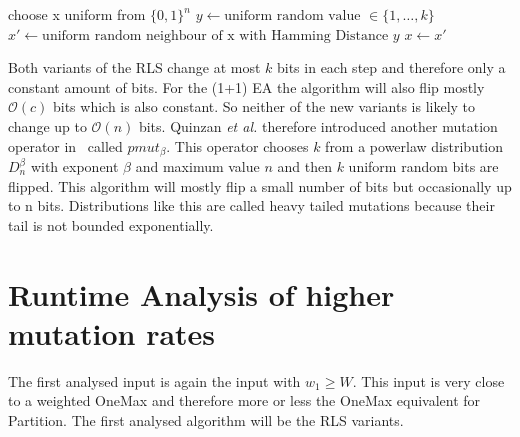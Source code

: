 \begin{algorithm}[bt]
      \caption{\textsc{\RLSR}}\label{alg:rlsR}

      \DontPrintSemicolon %

      \BlankLine
      choose x uniform from ${\{0,1\}}^n$\;
      {
      $y \leftarrow \text{uniform random value }\in \{1,\dots,k\}$\;
      $x' \leftarrow \text{uniform random neighbour of x with Hamming Distance } y$\;
      {
      {
            $x \leftarrow x'$\;
      }
      }
      }
\end{algorithm}

Both variants of the RLS change at most $k$ bits in each step and therefore only a constant amount of bits.
For the (1+1) EA the algorithm will also flip mostly $\mathcal{O}(c)$ bits which is also constant.
So neither of the new variants is likely to change up to $\mathcal{O}(n)$ bits.
Quinzan \textit{et al.} therefore introduced another mutation operator in~\cite{friedrich2018evolutionary} called $pmut_\beta$.
This operator chooses $k$ from a powerlaw distribution $D^\beta_n$ with exponent $\beta$ and maximum value $n$ and then $k$ uniform random bits are flipped.
This algorithm will mostly flip a small number of bits but occasionally up to n bits.
Distributions like this are called heavy tailed mutations because their tail is not bounded exponentially.

\section{Runtime Analysis of higher mutation rates}

The first analysed input is again the input with $w_1\ge W$.
This input is very close to a weighted OneMax and therefore more or less the OneMax equivalent for Partition.
The first analysed algorithm will be the RLS variants.

